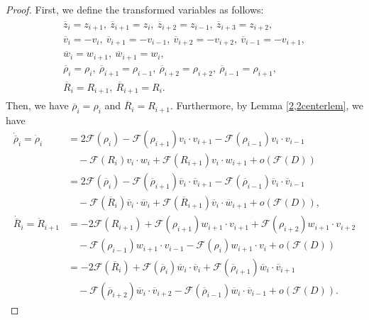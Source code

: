 \documentclass[reqno]{amsart}
\theoremstyle{plain}
\theoremstyle{definition}
\numberwithin{equation}{section}
\begin{document}
\begin{proof}
First, we define the transformed variables as follows:
\begin{align}\label{kaitenhanten}
\begin{aligned}
\overline{z}_i=z_{i+1},\ \overline{z}_{i+1}=z_i,\ \overline{z}_{i+2}=z_{i-1},\ \overline{z}_{i+3}=z_{i+2},
\\
\overline{v}_i=-v_i,\ \overline{v}_{i+1}=-v_{i-1},\ \overline{v}_{i+2}=-v_{i+2},\ \overline{v}_{i-1}=-v_{i+1},
\\
\overline{w}_i=w_{i+1},\ \overline{w}_{i+1}=w_i,
\\
\overline{\rho}_i=\rho_i,\ \overline{\rho}_{i+1}=\rho_{i-1},\ \overline{\rho}_{i+2}=\rho_{i+2},\ \overline{\rho}_{i-1}=\rho_{i+1},\\ 
\overline{R}_i=R_{i+1},\ \overline{R}_{i+1}=R_i.
\end{aligned}
\end{align}
Then, we have $\overline{\rho}_i=\rho_i$ and $\overline{R}_i=R_{i+1}$. Furthermore, by Lemma \ref{2,2centerlem}, we have
\begin{align*}
\dot{\overline{\rho}}_i=\dot{\rho}_i&=2\mathcal{F}(\rho_i)-\mathcal{F}(\rho_{i+1})v_i\cdot v_{i+1}-\mathcal{F}(\rho_{i-1})v_i\cdot v_{i-1}
\\
&\quad-\mathcal{F}(R_i)v_i\cdot w_i+\mathcal{F}(R_{i+1})v_i\cdot w_{i+1}+o\left(\mathcal{F}(D)\right)
\\
&=2\mathcal{F}(\overline{\rho}_i)-\mathcal{F}(\overline{\rho}_{i+1})\overline{v}_i\cdot \overline{v}_{i+1}-\mathcal{F}(\overline{\rho}_{i-1})\overline{v}_i\cdot \overline{v}_{i-1}
\\
&\quad-\mathcal{F}(\overline{R}_i)\overline{v}_i\cdot \overline{w}_i+\mathcal{F}(\overline{R}_{i+1})\overline{v}_i\cdot \overline{w}_{i+1}+o\left(\mathcal{F}(D)\right),
\\
\dot{\overline{R}}_i=\dot{R}_{i+1}&=-2\mathcal{F}(R_{i+1})+\mathcal{F}(\rho_{i+1})w_{i+1}\cdot v_{i+1}+\mathcal{F}(\rho_{i+2})w_{i+1}\cdot v_{i+2}
\\
&\quad -\mathcal{F}(\rho_{i-1})w_{i+1}\cdot v_{i-1}-\mathcal{F}(\rho_{i})w_{i+1}\cdot v_i+o\left(\mathcal{F}(D)\right)
\\
&=-2\mathcal{F}(\overline{R}_i)+\mathcal{F}(\overline{\rho}_i)\overline{w}_i\cdot \overline{v}_i+\mathcal{F}(\overline{\rho}_{i+1})\overline{w}_i\cdot \overline{v}_{i+1}
\\
&\quad-\mathcal{F}(\overline{\rho}_{i+2})\overline{w}_i\cdot \overline{v}_{i+2}-\mathcal{F}(\overline{\rho}_{i-1})\overline{w}_i\cdot \overline{v}_{i-1}+o\left(\mathcal{F}(D)\right).
\end{align*}

\end{proof}
\end{document}

